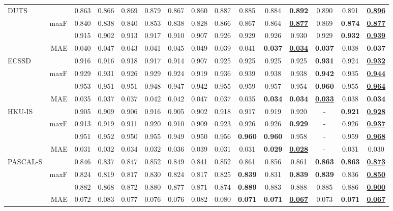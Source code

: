 \documentclass[10pt,twocolumn,letterpaper]{article}
\def\blu#1{\textbf{\color{blue} #1}} \def\red#1{\textbf{\color{red}\underline{#1}}}
\begin{document}
\begin{table*}[t]
\begin{tabular}{lr|cccccccccccc|c}
  \multirow{4}{*}{DUTS}
    &   &0.863 &0.866 &0.869 &0.879 &0.867 &0.860 &0.887 &0.885 &0.884 &\blu{0.892} &0.890 &0.891 &\red{0.896} \\
    & maxF &0.840 &0.838 &0.840 &0.853 &0.838 &0.828 &0.866 &0.867 &0.864 &\red{0.877} &0.869 &\blu{0.874} &\red{0.877}\\
    &  &0.915 &0.902 &0.913 &0.917 &0.910 &0.907 &0.926 &0.929 &0.926 &0.930 &0.929 &\blu{0.932} &\red{0.939}\\
  \cite{wang2017duts}& MAE &0.040 &0.047 &0.043 &0.041 &0.045 &0.049 &0.039 &0.041 &\blu{0.037} &\red{0.034} &\blu{0.037} &0.038 &\blu{0.037}\\
     \hline
  \multirow{4}{*}{ECSSD}
    &    &0.916 &0.916 &0.918 &0.917 &0.914 &0.907 &0.925 &0.925 &0.925 &0.925 &\blu{0.931} &0.924 &\red{0.932}\\
    & maxF  &0.929 &0.931 &0.926 &0.929 &0.924 &0.919 &0.936 &0.939 &0.938 &0.938 &\blu{0.942} &0.935 &\red{0.944}\\
    &  &0.953 &0.951 &0.951 &0.948 &0.947 &0.942 &0.955 &0.959 &0.957 &0.954 &\blu{0.960} &0.955 &\red{0.964} \\
   \cite{yan2013ECSSD}& MAE &0.035 &0.037 &0.037 &0.042 &0.042 &0.047 &0.037 &0.035 &\blu{0.034} &\blu{0.034} &\red{0.033} &0.038 &\blu{0.034}\\
     \hline
  \multirow{4}{*}{HKU-IS}
    &   &0.905 &0.909 &0.906 &0.916 &0.905 &0.902 &0.918 &0.917 &0.919 &0.920 &- &\blu{0.921} &\red{0.928} \\
    & maxF &0.913 &0.919 &0.911 &0.920 &0.910 &0.909 &0.923 &0.926 &0.926 &\blu{0.929} &- &0.926 &\red{0.937} \\
    &  &0.951 &0.952 &0.950 &0.955 &0.949 &0.950 &0.956 &\blu{0.960} &\blu{0.960} &0.958 &- &0.959 &\red{0.968}\\
     \cite{li2015HKUIS}& MAE &0.031 &0.032 &0.034 &0.032 &0.036 &0.039 &0.031 &0.031 &\blu{0.029} &\red{0.028} &- &0.031 &0.030\\
     \hline
  \multirow{4}{*}{PASCAL-S}
    &    &0.846 &0.837 &0.847 &0.852 &0.849 &0.841 &0.852 &0.861 &0.856 &0.861 &\blu{0.863} &\blu{0.863} &\red{0.873}\\
    & maxF  &0.824 &0.819 &0.817 &0.830 &0.824 &0.817 &0.825 &\blu{0.839} &0.831 &\blu{0.839} &\blu{0.839} &0.836 &\red{0.850}\\
    &   &0.882 &0.868 &0.872 &0.880 &0.877 &0.871 &0.874 &\blu{0.889} &0.883 &0.888 &0.885 &0.886 &\red{0.900} \\
    \cite{li2014PASCALS}& MAE &0.072 &0.083 &0.077 &0.076 &0.076 &0.082 &0.080 &\blu{0.071} &\blu{0.071} &\red{0.067} &0.073 &\blu{0.071} &\red{0.067}\\
     \hline


\end{tabular}
\end{table*}
\end{document}
